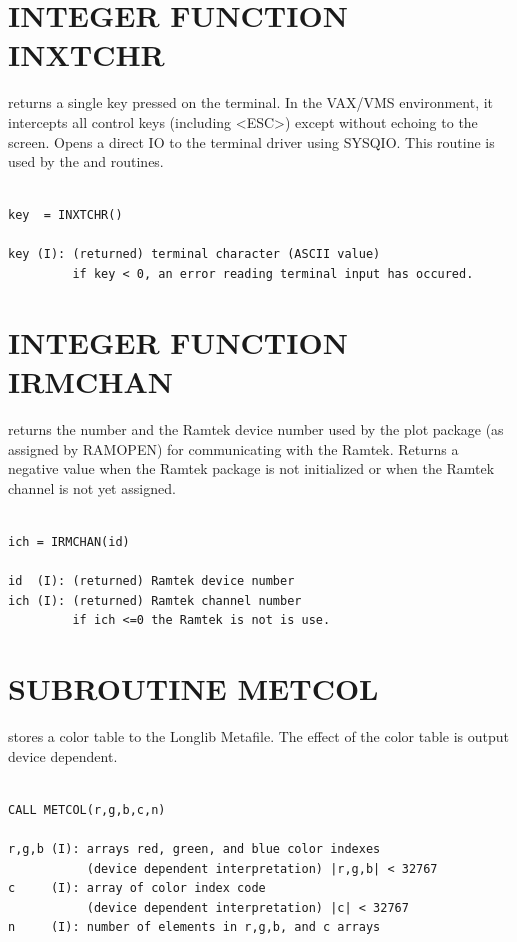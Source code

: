 \documentclass[11pt]{report}
\begin{document}
\section{INTEGER FUNCTION INXTCHR}

 returns a single key pressed on the terminal.  In the VAX/VMS
environment, it intercepts all control keys (including <ESC>) except 
without echoing to the screen.  Opens a direct IO  to
the terminal driver using SYSQIO. 
This routine is used by the  and  routines.
\begin{verbatim}

key  = INXTCHR()

key (I): (returned) terminal character (ASCII value)
         if key < 0, an error reading terminal input has occured.
\end{verbatim}

\section{INTEGER FUNCTION IRMCHAN}

 returns the  number and the Ramtek device number used
by the plot package (as assigned by RAMOPEN) for communicating with the Ramtek.
Returns a negative value when the Ramtek package is not initialized or when
the Ramtek channel is not yet assigned.
\begin{verbatim}

ich = IRMCHAN(id)

id  (I): (returned) Ramtek device number
ich (I): (returned) Ramtek channel number
         if ich <=0 the Ramtek is not is use.
\end{verbatim}

\section{SUBROUTINE METCOL}

 stores a color table to the Longlib Metafile.  The effect of the
color table is output device dependent.
\begin{verbatim}

CALL METCOL(r,g,b,c,n)

r,g,b (I): arrays red, green, and blue color indexes
           (device dependent interpretation) |r,g,b| < 32767
c     (I): array of color index code
           (device dependent interpretation) |c| < 32767
n     (I): number of elements in r,g,b, and c arrays
\end{verbatim}
\end{document}
